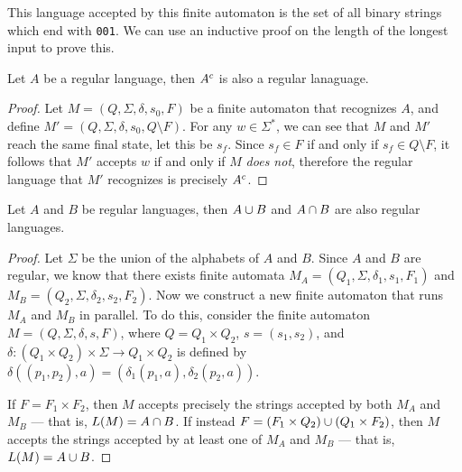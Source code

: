 \begin{exmp}
    This language accepted by this finite automaton is the set of all binary strings which end with \texttt{001}. We can use an inductive proof on the length of the longest input to prove this.
\end{exmp}

\begin{prop}\label{regular-language-complement}
    Let $A$ be a regular language, then $A^{c}$ is also a regular lanaguage.
\end{prop}

\begin{proof}
    Let $M = (Q, \Sigma, \delta, s_0, F)$ be a finite automaton that recognizes $A$, and define $M' = (Q, \Sigma, \delta, s_0, Q \setminus F)$. For any $w \in \Sigma^{*}$, we can see that $M$ and $M'$ reach the same final state, let this be $s_f$. Since $s_f \in F$ if and only if $s_f \in Q \setminus F$, it follows that $M'$ accepts $w$ if and only if $M$ \emph{does not}, therefore the regular language that $M'$ recognizes is precisely $A^{c}$.
\end{proof}

\begin{thm}\label{regular-language-union-intersection}
    Let $A$ and $B$ be regular languages, then $A \cup B$ and $A \cap B$ are also regular languages.
\end{thm}

\begin{proof}
    Let $\Sigma$ be the union of the alphabets of $A$ and $B$. Since $A$ and $B$ are regular, we know that there exists finite automata $M_A = \left(Q_1, \Sigma, \delta_1, s_1, F_1\right)$ and $M_B = \left(Q_2, \Sigma, \delta_2, s_2, F_2\right)$. Now we construct a new finite automaton that runs $M_A$ and $M_B$ in parallel. To do this, consider the finite automaton $M = \left(Q, \Sigma, \delta, s, F\right)$, where $Q = Q_1 \times Q_2$, $s = (s_1, s_2)$, and  $\delta: (Q_1 \times Q_2) \times \Sigma \to Q_1 \times Q_2$ is defined by $\delta\left((p_1, p_2), a\right) = \left(\delta_1\left(p_1, a\right), \delta_2\left(p_2, a\right)\right)$.
    
    If $F = F_1 \times F_2$, then $M$ accepts precisely the strings accepted by both $M_A$ and $M_B$ --- that is, $L(M) = A \cap B$. If instead $F = \left(F_1 \times Q_2\right) \cup \left(Q_1 \times F_2\right)$, then $M$ accepts the strings accepted by at least one of $M_A$ and $M_B$ --- that is, $L(M) = A \cup B$.
\end{proof}

